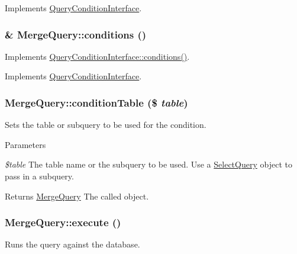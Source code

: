 Implements \hyperlink{interfaceQueryConditionInterface_aa6d9d96fa17441b5222d1ffddd4c1799}{QueryConditionInterface}.\hypertarget{classMergeQuery_a759f840d106e79a119d9130d09123b8d}{
\subsubsection[{conditions}]{\setlength{\rightskip}{0pt plus 5cm}\& MergeQuery::conditions ()}}
\label{classMergeQuery_a759f840d106e79a119d9130d09123b8d}
Implements \hyperlink{interfaceQueryConditionInterface_a894cc290ed61feb3693b1d459ae86888}{QueryConditionInterface::conditions()}. 

Implements \hyperlink{interfaceQueryConditionInterface_a894cc290ed61feb3693b1d459ae86888}{QueryConditionInterface}.\hypertarget{classMergeQuery_a0dbb5c2ac711fede2344a02cc49b0efb}{
\subsubsection[{conditionTable}]{\setlength{\rightskip}{0pt plus 5cm}MergeQuery::conditionTable (\$ {\em table})}}
\label{classMergeQuery_a0dbb5c2ac711fede2344a02cc49b0efb}
Sets the table or subquery to be used for the condition.


\begin{DoxyParams}{Parameters}
\item[{\em \$table}]The table name or the subquery to be used. Use a \hyperlink{classSelectQuery}{SelectQuery} object to pass in a subquery.\end{DoxyParams}
\begin{DoxyReturn}{Returns}
\hyperlink{classMergeQuery}{MergeQuery} The called object. 
\end{DoxyReturn}
\hypertarget{classMergeQuery_aeea46fdb119752efd2048d66b9fe8de8}{
\subsubsection[{execute}]{\setlength{\rightskip}{0pt plus 5cm}MergeQuery::execute ()}}
\label{classMergeQuery_aeea46fdb119752efd2048d66b9fe8de8}
Runs the query against the database. 

